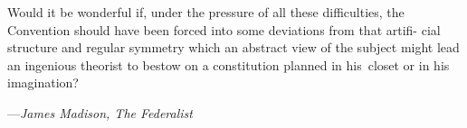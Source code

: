 \newpage

\null
\vskip 1in

\thispagestyle{empty}

\begingroup
\raggedright \small
\list{}{\rightmargin=8pc \leftmargin=8pc}\item[]
Would it be wonderful if, under the
pressure of all these difficulties, the
Convention should have been forced
into some deviations from that artifi-
cial structure and regular symmetry 
which an abstract view of the subject 
might lead an ingenious theorist to 
bestow on a constitution planned in 
his~closet or in his imagination?
\par\vskip 4pt
\begin{tabbing}
---\={\it James Madison, The Federalist} \\
\end{tabbing}
\endlist
\endgroup
